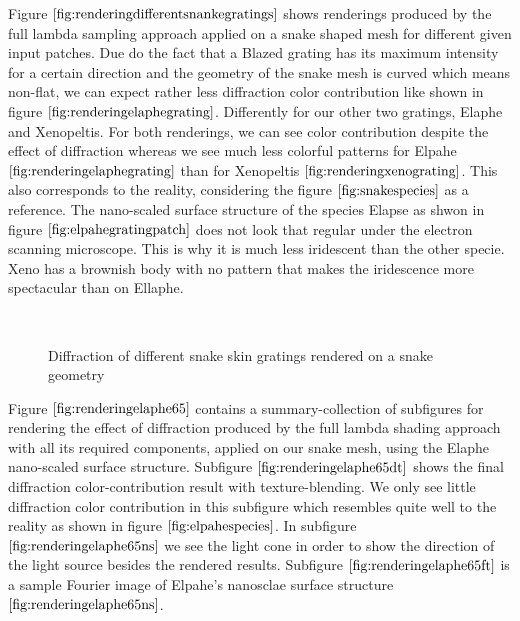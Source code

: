 Figure $\ref{fig:renderingdifferentsnankegratings}$ shows renderings produced by the full lambda sampling approach applied on a snake shaped mesh for different given input patches. Due do the fact that a Blazed grating has its maximum intensity for a certain direction and the geometry of the snake mesh is curved which means non-flat, we can expect rather less diffraction color contribution like shown in figure $\ref{fig:renderingelaphegrating}$. Differently for our other two gratings, Elaphe and Xenopeltis. For both renderings, we can see color contribution despite the effect of diffraction whereas we see much less colorful patterns for Elpahe $\ref{fig:renderingelaphegrating}$ than for Xenopeltis $\ref{fig:renderingxenograting}$. This also corresponds to the reality, considering the figure $\ref{fig:snakespecies}$ as a reference. The nano-scaled surface structure of the species Elapse as shwon in figure $\ref{fig:elpahegratingpatch}$ does not look that regular under the electron scanning microscope. This is why it is much less iridescent than the other specie. Xeno has a brownish body with no pattern that makes the iridescence more spectacular than on Ellaphe. 
 
\begin{figure}[H]
  \centering
~
~
  
\caption{Diffraction of different snake skin gratings rendered on a snake geometry}
\label{fig:renderingdifferentsnankegratings}
\end{figure}

Figure $\ref{fig:renderingelaphe65}$ contains a summary-collection of subfigures for rendering the effect of diffraction produced by the full lambda shading approach with all its required components, applied on our snake mesh, using the Elaphe nano-scaled surface structure. Subfigure $\ref{fig:renderingelaphe65dt}$ shows the final diffraction color-contribution result with texture-blending. We only see little diffraction color contribution in this subfigure which resembles quite well to the reality as shown in figure $\ref{fig:elpahespecies}$. In subfigure $\ref{fig:renderingelaphe65ns}$ we see the light cone in order to show the direction of the light source besides the rendered results. Subfigure $\ref{fig:renderingelaphe65ft}$ is a sample Fourier image of Elpahe's nanosclae surface structure $\ref{fig:renderingelaphe65ns}$.

